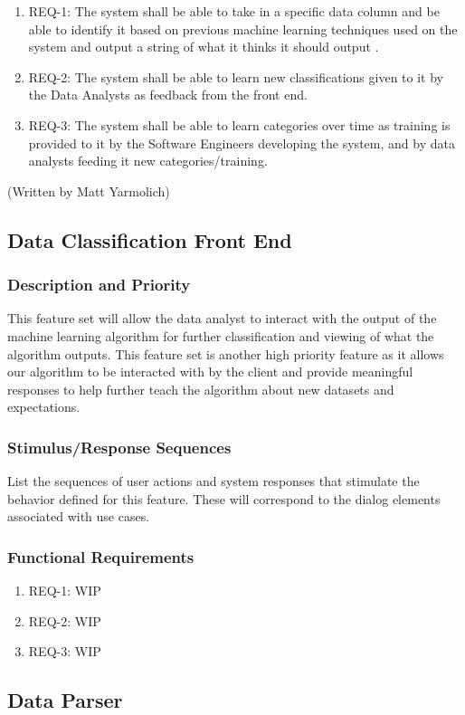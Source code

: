 \documentclass[12pt,oneside,letterpaper]{article}
\begin{document}
\begin{enumerate}
\item REQ-1: The system shall be able to take in a specific data column and be able to identify it based on previous machine learning techniques used on the system and output a string of what it thinks it should output .
\item REQ-2: The system shall be able to learn new classifications given to it by the Data Analysts as feedback from the front end.
\item REQ-3: The system shall be able to learn categories over time as training is provided to it by the Software Engineers developing the system, and by data analysts feeding it new categories/training.
\end{enumerate} (Written by Matt Yarmolich)

\subsection{Data Classification Front End}
\subsubsection{Description and Priority}
This feature set will allow the data analyst to interact with the output of the machine learning algorithm for further classification and viewing of what the algorithm outputs. This feature set is another high priority feature as it allows our algorithm to be interacted with by the client and provide meaningful responses to help further teach the algorithm about new datasets and expectations. 
\subsubsection{Stimulus/Response Sequences}
List the sequences of user actions and system responses that stimulate the behavior defined for this feature. These will correspond to the dialog elements associated with use cases.
\subsubsection{Functional Requirements}
\begin{enumerate}
\item REQ-1: WIP
\item REQ-2: WIP
\item REQ-3: WIP
\end{enumerate}

\subsection{Data Parser}
\end{document}
